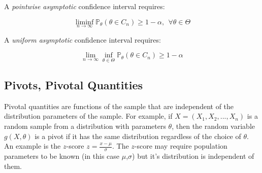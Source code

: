 A \textit{pointwise asymptotic} confidence interval requires:

\begin{equation}
\liminf_{n\rightarrow \infty} \mathbb{P}_{\theta}(\theta \in C_n) \geq 1-\alpha,	\ \ \forall \theta \in \Theta
\end{equation}   

A \textit{uniform asymptotic} confidence interval requires:

\begin{equation}
\lim_{n\rightarrow \infty}\inf_{\theta \in \Theta} \mathbb{P}_{\theta}(\theta \in C_n) \geq 1-\alpha
\end{equation}


\subsection{Pivots, Pivotal Quantities}
Pivotal quantities are functions of the sample that are independent of the distribution parameters of the sample. For example, if $X=(X_1,X_2,...,X_n)$ is a random sample from a distribution with parameters $\theta$, then the random variable $g(X,\theta)$ is a pivot if it has the same distribution regardless of the choice of $\theta$. An example is the $z$-score $z = \frac{x-\mu}{\sigma}$. The $z$-score may require population parameters to be known (in this case $\mu$,$\sigma$) but it's distribution is independent of them. 

